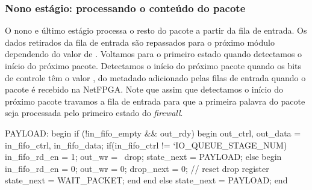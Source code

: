 \subsubsection*{Nono estágio: processando o conteúdo do pacote}

O nono e último estágio processa o resto do pacote a partir da fila de
entrada.  Os dados retirados da fila de entrada são repassados para o
próximo módulo dependendo do valor de .  Voltamos para o
primeiro estado quando detectamos o início do próximo pacote.
Detectamos o início do próximo pacote quando os bits de controle têm o
valor , do metadado adicionado pelas filas de
entrada quando o pacote é recebido na NetFPGA.  Note que assim que
detectamos o início do próximo pacote travamos a fila de entrada para
que a primeira palavra do pacote seja processada pelo primeiro estado do
\emph{firewall}.

\begin{verilogcode}
      PAYLOAD: begin
         if (!in_fifo_empty && out_rdy) begin
            {out_ctrl, out_data} = {in_fifo_ctrl, in_fifo_data};
            if(in_fifo_ctrl != `IO_QUEUE_STAGE_NUM)
                in_fifo_rd_en = 1;
                out_wr = ~drop;
                state_next = PAYLOAD;
            else begin
               in_fifo_rd_en = 0;
               out_wr = 0;
               drop_next = 0;            // reset drop register
               state_next = WAIT_PACKET;
            end
         end
         else
            state_next = PAYLOAD;
      end
\end{verilogcode}


